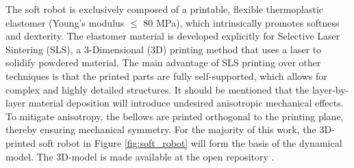 The soft robot is exclusively composed of a printable, flexible thermoplastic elastomer (Young's modulus $\le$ 80 MPa), which intrinsically promotes softness and dexterity. The elastomer material is developed explicitly for Selective Laser Sintering (SLS), a 3-Dimensional (3D) printing method that uses a laser to solidify powdered material. The main advantage of SLS printing over other techniques is that the printed parts are fully self-supported, which allows for complex and highly detailed structures. It should be mentioned that the layer-by-layer material deposition will introduce undesired anisotropic mechanical effects. To mitigate anisotropy, the bellows are printed orthogonal to the printing plane, thereby ensuring mechanical symmetry. For the majority of this work, the 3D-printed soft robot in Figure \ref{fig:soft_robot} will form the basis of the dynamical model. The 3D-model is made available at the open repository \cite{Caasenbrood2020}.
